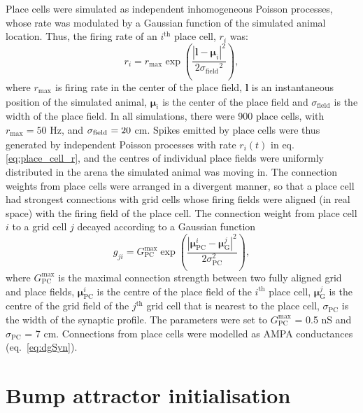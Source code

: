 \documentclass[a4paper,12pt]{article}
\newcommand{\ssc}[3]{\ensuremath{#1_{\text{#2}_{\text{#3}}}}}
\newcommand{\sigmasub}[1]{\ssc{\sigma}{\scriptsize{#1}}{}}
\begin{document}
Place cells were simulated as independent inhomogeneous Poisson processes,
whose rate was modulated by a Gaussian function of the simulated animal
location. Thus, the firing rate of an $i^{\text{th}}$ place cell, $r_i$ was:
\begin{equation}
    r_i = \ssc{r}{max}{} \exp\left( \frac{|\mathbf{l} - \bm{\mu}_i|^2}{2
            \ssc{\sigma}{field}{}^2} \right),
    \label{eq:place_cell_r}
\end{equation}
where $\ssc{r}{max}{}$ is firing rate in the center of the place field,
$\mathbf{l}$ is an instantaneous position of the simulated animal,
$\bm{\mu}_i$ is the center of the place field and
$\ssc{\sigma}{field}{}$ is the width of the place field.
In all simulations,
there were 900 place cells, with $\ssc{r}{max}{} = 50$ Hz, and $\sigmasub{field}
= 20$ cm.  Spikes emitted by place cells were thus generated by independent
Poisson processes with rate $r_i(t)$ in eq. \eqref{eq:place_cell_r}, and the
centres of individual place fields were uniformly distributed in the arena the
simulated animal was moving in.
The connection weights from place cells were arranged in a divergent
manner, so that a place cell had strongest connections with grid cells whose
firing fields were aligned (in real space) with the firing field of the place
cell. The connection weight from place
cell $i$ to a grid cell $j$ decayed according to a Gaussian function
\begin{equation}
    g_{ji} = G_{\text{PC}}^{\text{max}} \exp\left( \frac{|\bm{\mu}_{\text{PC}}^{i} -
    \bm{\mu}_{\text{G}}^j|^2}{2\sigma_\text{PC}^2} \right),
    \label{eq:TG_pc_diverg_conn}
\end{equation}
where $G_{\text{PC}}^{\text{max}}$ is the maximal connection strength between
two fully aligned grid and place fields, $\bm{\mu}_{\text{PC}}^{i}$ is the
centre of the place field of the $i^{\text{th}}$ place cell,
$\bm{\mu}_{\text{G}}^j$ is the centre of the grid field of the $j^{\text{th}}$
grid cell that is nearest to the place cell, $\sigma_\text{PC}$ is the width of
the synaptic profile. The parameters were set to $G_{\text{PC}}^{\text{max}}$ =
0.5 nS and $\sigma_\text{PC}$ = 7 cm. Connections from place cells were modelled
as AMPA conductances (eq.~\ref{eq:dgSyn}).



\section{Bump attractor initialisation} \label{sec:noise_bump_init_app}
\end{document}
